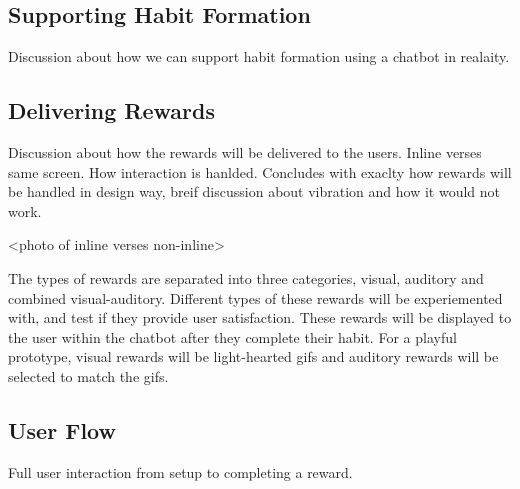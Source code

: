 \subsection{Supporting Habit Formation}

Discussion about how we can support habit formation using a chatbot in realaity.



\subsection{Delivering Rewards}

Discussion about how the rewards will be delivered to the users. Inline verses same screen. How interaction is hanlded. Concludes with exaclty how rewards will be handled in design way, breif discussion about vibration and how it would not work.

<photo of inline verses non-inline>

The types of rewards are separated into three categories, visual, auditory and combined visual-auditory. Different types of these rewards will be experiemented with,
and test if they provide user satisfaction. These rewards will be displayed to the user within the chatbot after they complete their habit.
For a playful prototype, visual rewards will be light-hearted gifs and auditory rewards will be selected to match the gifs.






\subsection{User Flow}

Full user interaction from setup to completing a reward.



